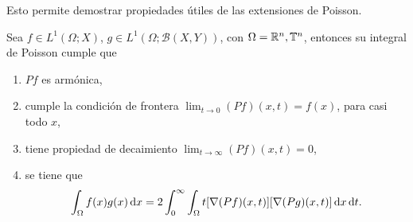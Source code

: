 Esto permite demostrar propiedades útiles de las extensiones de Poisson.
\begin{theorem}\label{theo:prop-Poisson}
	Sea $f\in L^1(\Omega;X)$, $g\in L^1(\Omega;\mathcal{B}(X, Y))$, con $\Omega=\mathbb{R}^n,\mathbb{T}^n$, entonces su integral de Poisson cumple que
	\begin{enumerate}
		\item $Pf$ es armónica, 
		\item cumple la condición de frontera $\lim_{t\to0}(Pf)(x, t) = f(x)$, para casi todo $x$,
		\item tiene propiedad de decaimiento $\lim_{t\to\infty}(Pf)(x, t) = 0$,
		\item se tiene que 
		\begin{equation*}
			\int_{\Omega} f(x)g(x)\mathop{}\!\mathrm{d} x =2 \int_0^\infty\int_{\Omega} t[\nabla(Pf)(x, t)][\nabla(Pg)(x, t)]\mathop{}\!\mathrm{d} x \mathop{}\!\mathrm{d} t.
		\end{equation*}
	\end{enumerate}
\end{theorem}

